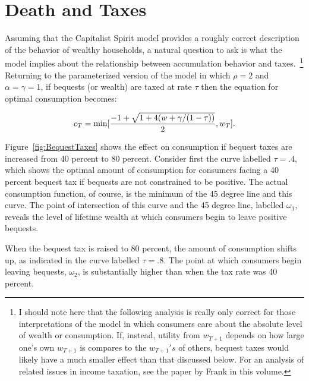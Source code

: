 \documentclass[titlepage,12pt]{article}
\begin{document}
\hypertarget{wealth-and-taxes}{}
\section{Death and Taxes}
Assuming that the Capitalist Spirit model provides a roughly correct 
description of the behavior of wealthy households, a natural question 
to ask is what the model implies about the relationship between 
accumulation behavior and taxes.~\footnote{I should note here that the 
following analysis is really only correct for those interpretations of 
the model in which consumers care about the absolute level of wealth 
or consumption.  If, instead, utility from $w_{T+1}$ depends on how 
large one's own $w_{T+1}$ is compares to the $w_{T+1}'s$ of others, 
bequest taxes would likely have a much smaller effect than that 
discussed below.  For an analysis of related issues in income 
taxation, see the paper by Frank in this volume.} Returning to the 
parameterized version of the model in which $\rho = 2$ and $\alpha = 
\gamma = 1$, if bequests (or wealth) are taxed at rate $\tau$ then the 
equation for optimal consumption becomes:

\begin{eqnarray}
    c_{T}=\min [ {{-1 + {\sqrt{1 + 4(w+\gamma/(1-\tau))}}} \over 2},w_{T}].
	\label{eq:TaxSoln}
\end{eqnarray}


Figure~\ref{fig:BequestTaxes} shows the effect on consumption if 
bequest taxes are increased from 40 percent to 80 percent.  Consider 
first the curve labelled $\tau = .4$, which shows the optimal amount 
of consumption for consumers facing a 40 percent bequest tax if 
bequests are not constrained to be positive.  The actual consumption 
function, of course, is the minimum of the 45 degree line and this 
curve.  The point of intersection of this curve and the 45 degree 
line, labelled $\omega_{1}$, reveals the level of lifetime wealth at 
which consumers begin to leave positive bequests.

When the bequest tax is raised to 80 percent, the amount of 
consumption shifts up, as indicated in the curve labelled $\tau = 
.8$.  The point at which consumers begin leaving bequests, 
$\omega_{2}$, is substantially higher than when the tax rate was 40 
percent.  
\end{document}
